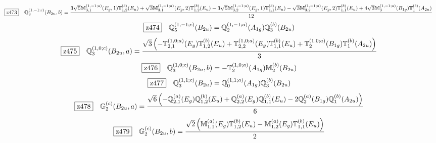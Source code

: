 \documentclass[fleqn,10pt,landscape]{jsarticle}
\begin{document}
\begin{dmath*}
\hspace*{3mm}\fbox{z473}\quad \mathbb{Q}_{3}^{(1,-1;c)}(B_{2u},b)=\frac{3 \sqrt{5} \mathbb{M}_{3,1}^{(1,-1;a)}(E_{g},1) \mathbb{T}_{1,2}^{(b)}(E_{u}) + \sqrt{3} \mathbb{M}_{3,1}^{(1,-1;a)}(E_{g},2) \mathbb{T}_{1,2}^{(b)}(E_{u}) - 3 \sqrt{5} \mathbb{M}_{3,2}^{(1,-1;a)}(E_{g},1) \mathbb{T}_{1,1}^{(b)}(E_{u}) - \sqrt{3} \mathbb{M}_{3,2}^{(1,-1;a)}(E_{g},2) \mathbb{T}_{1,1}^{(b)}(E_{u}) + 4 \sqrt{3} \mathbb{M}_{3}^{(1,-1;a)}(B_{1g}) \mathbb{T}_{1}^{(b)}(A_{2u})}{12}
\end{dmath*}
\begin{dmath*}
\hspace*{3mm}\fbox{z474}\quad \mathbb{Q}_{5}^{(1,-1;c)}(B_{2u})=\mathbb{Q}_{2}^{(1,-1;a)}(A_{1g}) \mathbb{Q}_{3}^{(b)}(B_{2u})
\end{dmath*}
\begin{dmath*}
\hspace*{3mm}\fbox{z475}\quad \mathbb{Q}_{3}^{(1,0;c)}(B_{2u},a)=\frac{\sqrt{3} \left(- \mathbb{T}_{2,1}^{(1,0;a)}(E_{g}) \mathbb{T}_{1,2}^{(b)}(E_{u}) + \mathbb{T}_{2,2}^{(1,0;a)}(E_{g}) \mathbb{T}_{1,1}^{(b)}(E_{u}) + \mathbb{T}_{2}^{(1,0;a)}(B_{1g}) \mathbb{T}_{1}^{(b)}(A_{2u})\right)}{3}
\end{dmath*}
\begin{dmath*}
\hspace*{3mm}\fbox{z476}\quad \mathbb{Q}_{3}^{(1,0;c)}(B_{2u},b)=- \mathbb{T}_{2}^{(1,0;a)}(A_{1g}) \mathbb{M}_{2}^{(b)}(B_{2u})
\end{dmath*}
\begin{dmath*}
\hspace*{3mm}\fbox{z477}\quad \mathbb{Q}_{3}^{(1,1;c)}(B_{2u})=\mathbb{Q}_{0}^{(1,1;a)}(A_{1g}) \mathbb{Q}_{3}^{(b)}(B_{2u})
\end{dmath*}
\begin{dmath*}
\hspace*{3mm}\fbox{z478}\quad \mathbb{G}_{2}^{(c)}(B_{2u},a)=\frac{\sqrt{6} \left(- \mathbb{Q}_{2,1}^{(a)}(E_{g}) \mathbb{Q}_{1,2}^{(b)}(E_{u}) + \mathbb{Q}_{2,2}^{(a)}(E_{g}) \mathbb{Q}_{1,1}^{(b)}(E_{u}) - 2 \mathbb{Q}_{2}^{(a)}(B_{1g}) \mathbb{Q}_{1}^{(b)}(A_{2u})\right)}{6}
\end{dmath*}
\begin{dmath*}
\hspace*{3mm}\fbox{z479}\quad \mathbb{G}_{2}^{(c)}(B_{2u},b)=\frac{\sqrt{2} \left(\mathbb{M}_{1,1}^{(a)}(E_{g}) \mathbb{T}_{1,2}^{(b)}(E_{u}) - \mathbb{M}_{1,2}^{(a)}(E_{g}) \mathbb{T}_{1,1}^{(b)}(E_{u})\right)}{2}
\end{dmath*}
\end{document}
